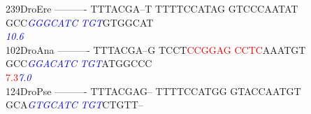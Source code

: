 \documentclass[11pt,twoside,reqno,a4paper]{article}
\begin{document}
{239\hspace*{1\charwidth}DroEre	----------	TTTACGA--T	TTTTCCATAG	GTCCCAATAT	GCC\textit{\textcolor{blue}{G}}\textit{\textcolor{blue}{G}}\textit{\textcolor{blue}{G}}\textit{\textcolor{blue}{C}}\textit{\textcolor{blue}{A}}\textit{\textcolor{blue}{T}}\textit{\textcolor{blue}{C}}	\textit{\textcolor{blue}{T}}\textit{\textcolor{blue}{G}}\textit{\textcolor{blue}{T}}GTGGCAT	\\
\hspace*{4\charwidth}\hspace*{7\charwidth}\hspace*{1\charwidth}\hspace*{1\charwidth}\hspace*{1\charwidth}\hspace*{1\charwidth}\hspace*{43\charwidth}\textit{\textcolor{blue}{10.6}}\hspace*{1\charwidth}\hspace*{1\charwidth}\\
102\hspace*{1\charwidth}DroAna	----------	TTTACGA--G	TCCT\textcolor{red}{C}\textcolor{red}{C}\textcolor{red}{G}\textcolor{red}{G}\textcolor{red}{A}\textcolor{red}{G}	\textcolor{red}{C}\textcolor{red}{C}\textcolor{red}{T}\textcolor{red}{C}AAATGT	GCC\textit{\textcolor{blue}{G}}\textit{\textcolor{blue}{G}}\textit{\textcolor{blue}{A}}\textit{\textcolor{blue}{C}}\textit{\textcolor{blue}{A}}\textit{\textcolor{blue}{T}}\textit{\textcolor{blue}{C}}	\textit{\textcolor{blue}{T}}\textit{\textcolor{blue}{G}}\textit{\textcolor{blue}{T}}ATGGCCC	\\
\hspace*{4\charwidth}\hspace*{7\charwidth}\hspace*{1\charwidth}\hspace*{1\charwidth}\hspace*{24\charwidth}\textcolor{red}{7.3}\hspace*{1\charwidth}\hspace*{1\charwidth}\hspace*{16\charwidth}\textit{\textcolor{blue}{7.0}}\hspace*{1\charwidth}\hspace*{1\charwidth}\\
124\hspace*{1\charwidth}DroPse	----------	TTTACGAG--	TTTTCCATGG	GTACCAATGT	GCA\textit{\textcolor{blue}{G}}\textit{\textcolor{blue}{T}}\textit{\textcolor{blue}{G}}\textit{\textcolor{blue}{C}}\textit{\textcolor{blue}{A}}\textit{\textcolor{blue}{T}}\textit{\textcolor{blue}{C}}	\textit{\textcolor{blue}{T}}\textit{\textcolor{blue}{G}}\textit{\textcolor{blue}{T}}CTGTT--	\\
}
\end{document}
